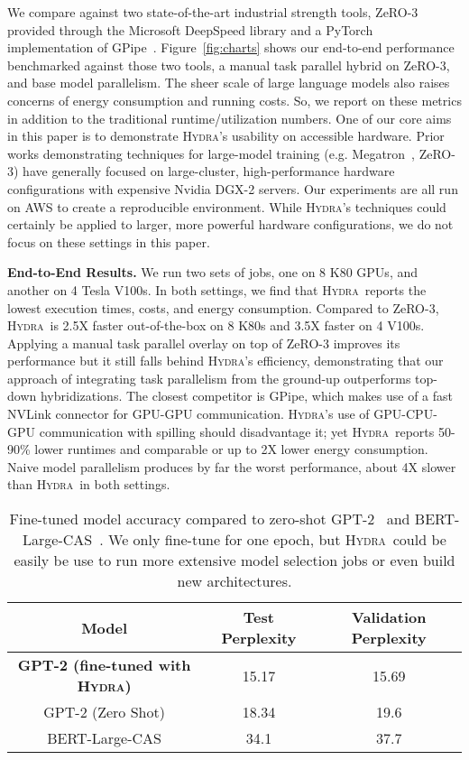 \documentclass{article}
\newcommand{\system}{\textsc{Hydra}}
\begin{document}
We compare against two state-of-the-art industrial strength tools, ZeRO-3~\cite{zeroOpt,zeroDeep} provided through the Microsoft DeepSpeed library and a PyTorch implementation of GPipe~\cite{gpipe,torchgpipe}. Figure~\ref{fig:charts} shows our end-to-end performance benchmarked against those two tools, a manual task parallel hybrid on ZeRO-3, and base model parallelism. The sheer scale of large language models also raises concerns of energy consumption and running costs. So, we report on these metrics in addition to the traditional runtime/utilization numbers. One of our core aims in this paper is to demonstrate \system's usability on accessible hardware. Prior works demonstrating techniques for large-model training (e.g. Megatron~\cite{shoeybi2019megatron}, ZeRO-3) have generally focused on large-cluster, high-performance hardware configurations with expensive Nvidia DGX-2 servers. Our experiments are all run on AWS to create a reproducible environment. While \system's techniques could certainly be applied to larger, more powerful hardware configurations, we do not focus on these settings in this paper. 

\textbf{End-to-End Results.} We run two sets of jobs, one on 8 K80 GPUs, and another on 4 Tesla V100s.  In both settings, we find that \system~reports the lowest execution times, costs, and energy consumption. Compared to ZeRO-3, \system~is 2.5X faster out-of-the-box on 8 K80s and 3.5X faster on 4 V100s. Applying a manual task parallel overlay on top of ZeRO-3 improves its performance but it still falls behind \system's efficiency, demonstrating that our approach of integrating task parallelism from the ground-up outperforms top-down hybridizations. The closest competitor is GPipe, which makes use of a fast NVLink connector for GPU-GPU communication. \system's use of GPU-CPU-GPU communication with spilling should disadvantage it; yet \system~reports 50-90\% lower runtimes and comparable or up to 2X lower energy consumption. Naive model parallelism produces by far the worst performance, about 4X slower than \system~in both settings.

\begin{table}
\label{tb:accuracy}
\centering
\begin{tabular}{ c c c }
Model & Test Perplexity & Validation Perplexity\\ [0.5ex] 
 \hline\hline
  \textbf{GPT-2 (fine-tuned with \system)} & 15.17 & 15.69 \\    
 GPT-2 (Zero Shot) & 18.34 & 19.6 \\ 
 BERT-Large-CAS & 34.1 & 37.7 \\    
\end{tabular}
\vspace{1.5mm}
 \caption{Fine-tuned model accuracy compared to zero-shot GPT-2~\cite{radford2019language} and BERT-Large-CAS~\cite{wang2019cas}. We only fine-tune for one epoch, but \system~could be easily be use to run more extensive model selection jobs or even build new architectures.}
\end{table}
\end{document}
